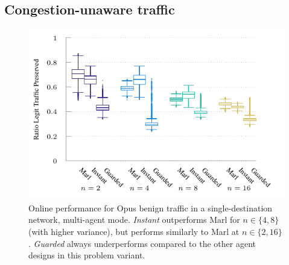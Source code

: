 \documentclass[10pt, times, conference, letterpaper]{IEEEtran}
\begin{document}
\subsection{Congestion-unaware traffic}
%	
%	
\begin{figure}
	\centering
	\includegraphics[width=0.95\linewidth]{../plots/tnsm-udp-box-separate}
	
	\caption{
		Online performance for Opus benign traffic in a single-destination network, multi-agent mode.
		\emph{Instant} outperforms Marl for $n \in \{4, 8\}$ (with higher variance), but performs similarly to Marl at $n\in \{2, 16\}$.
		\emph{Guarded} always underperforms compared to the other agent designs in this problem variant.
		\label{fig:udp-tree-box}
	}
\end{figure}
\end{document}
